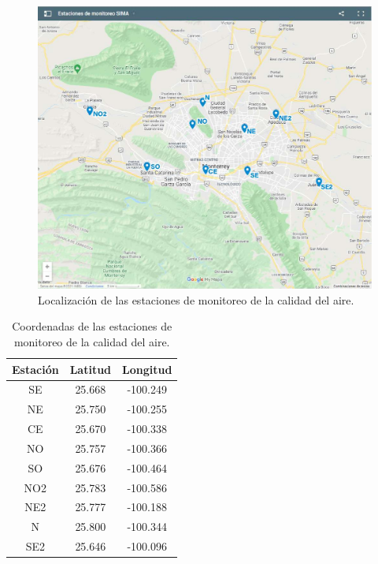 \begin{figure}[h!]
\setcounter{figure}{0} %
\captionsetup{type=figure} %
\begin{center}
   \includegraphics[trim=50 50 50 50,clip,width=1\textwidth]{mapa_estaciones.eps}
   \end{center}
    \caption{Localización de las estaciones de monitoreo de la calidad del aire.}
    \label{estaciones}
\end{figure}

\begin{table}[H]
	{\centering
		\caption{Coordenadas de las estaciones de monitoreo de la calidad del aire.}
		\begin{tabular}{|c|c|c|}
			\hline 
			Estación & Latitud & Longitud\\
			\hline
			SE & 25.668 & -100.249\\
			\hline
			NE & 25.750 & -100.255\\
			\hline
			CE & 25.670 & -100.338\\
			\hline
			NO & 25.757 & -100.366\\
			\hline
			SO & 25.676 & -100.464\\
			\hline
			NO2 & 25.783 & -100.586\\
			\hline
			NE2 & 25.777 & -100.188\\
			\hline
			N & 25.800 & -100.344\\
			\hline
			SE2 & 25.646 & -100.096\\
			\hline
		\end{tabular}
		
	\label{tab:Coordenadas estaciones}
	}
\end{table}












